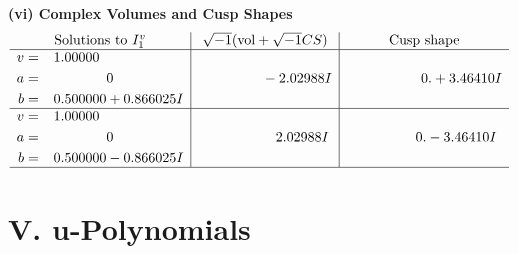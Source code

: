 \documentclass[1p]{elsarticle_modified}
\theoremstyle{definition}
\newcommand{\I}{\sqrt{-1}}
\begin{document}
\newpage\flushleft \textbf{(vi) Complex Volumes and Cusp Shapes}
$$\begin{array}{c|c|c}  
\text{Solutions to }I^v_{1}& \I (\text{vol} + \sqrt{-1}CS) & \text{Cusp shape}\\
 \hline 
\begin{aligned}
v &= \phantom{-}1.00000\phantom{ +0.000000I} \\
a &= \phantom{-0.000000 } 0 \\
b &= \phantom{-}0.500000 + 0.866025 I\end{aligned}
 & \phantom{-0.000000 } -2.02988 I & \phantom{-0.000000 -}0. + 3.46410 I \\ \hline\begin{aligned}
v &= \phantom{-}1.00000\phantom{ +0.000000I} \\
a &= \phantom{-0.000000 } 0 \\
b &= \phantom{-}0.500000 - 0.866025 I\end{aligned}
 & \phantom{-0.000000 -}2.02988 I & \phantom{-0.000000 } 0. - 3.46410 I\\
 \hline 
 \end{array}$$\newpage
\newpage\renewcommand{\arraystretch}{1}
\centering \section*{ V. u-Polynomials}
\end{document}
